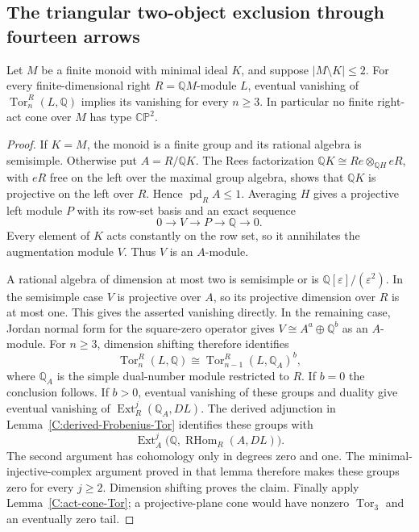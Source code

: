 \subsection{The triangular two-object exclusion through fourteen arrows}

\begin{lemma}
\label{C:two-outside-act-obstruction}
Let $M$ be a finite monoid with minimal ideal $K$, and suppose
$|M\setminus K|\leq2$.  For every finite-dimensional right
$R=\mathbb QM$-module $L$, eventual vanishing of
$\operatorname{Tor}_n^R(L,\mathbb Q)$ implies its vanishing for
every $n\geq3$.  In particular no finite right-act cone over $M$
has type $\mathbb{CP}^2$.
\end{lemma}
\begin{proof}
If $K=M$, the monoid is a finite group and its rational algebra
is semisimple.  Otherwise put $A=R/\mathbb QK$.
The Rees factorization
$\mathbb QK\cong Re\otimes_{\mathbb QH}eR$, with $eR$ free on
the left over the maximal group algebra, shows that $\mathbb QK$
is projective on the left over $R$.  Hence
$\operatorname{pd}_R A\leq1$.
Averaging $H$ gives a projective left module $P$ with its row-set
basis and an exact sequence
\[
0\longrightarrow V\longrightarrow P\longrightarrow\mathbb Q
\longrightarrow0.
\]
Every element of $K$ acts constantly on the row set, so it
annihilates the augmentation module $V$.  Thus $V$ is an $A$-module.

A rational algebra of dimension at most two is semisimple or is
$\mathbb Q[\varepsilon]/(\varepsilon^2)$.  In the semisimple case
$V$ is projective over $A$, so its projective dimension over $R$
is at most one.  This gives the asserted vanishing directly.
In the remaining case, Jordan normal form for the square-zero
operator gives
$V\cong A^a\oplus\mathbb Q^b$ as an $A$-module.
For $n\geq3$, dimension shifting therefore identifies
\[
\operatorname{Tor}_n^R(L,\mathbb Q)
 \cong\operatorname{Tor}_{n-1}^R(L,\mathbb Q_A)^b,
\]
where $\mathbb Q_A$ is the simple dual-number module restricted
to $R$.
If $b=0$ the conclusion follows.  If $b>0$, eventual vanishing
of these groups and duality give eventual vanishing of
$\operatorname{Ext}_R^j(\mathbb Q_A,DL)$.
The derived adjunction in Lemma~\ref{C:derived-Frobenius-Tor}
identifies these groups with
\[
\operatorname{Ext}_A^j\bigl(\mathbb Q,
                     \operatorname{RHom}_R(A,DL)\bigr).
\]
The second argument has cohomology only in degrees zero and one.
The minimal-injective-complex argument proved in that lemma
therefore makes these groups zero for every $j\geq2$.
Dimension shifting proves the claim.  Finally apply
Lemma~\ref{C:act-cone-Tor}; a projective-plane cone would have
nonzero $\operatorname{Tor}_3$ and an eventually zero tail.
\end{proof}

